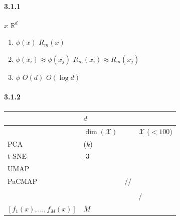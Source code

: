 \documentclass[
  12pt,
]{article}
\providecommand{\tightlist}{%
  \setlength{\itemsep}{0pt}\setlength{\parskip}{0pt}}
\begin{document}
\paragraph{3.1.1
}\label{ux5d4cux5165ux9009ux62e9ux7684ux539fux5219}

 \(x\) 
\(\mathbb{R}^d\)

\begin{enumerate}
\def\labelenumi{\arabic{enumi}.}
\tightlist
\item
  \textbf{}\(\phi(x)\)  \(R_m(x)\) 
\item
  \textbf{} \(\phi(x_i) \approx \phi(x_j)\) 
  \(R_m(x_i) \approx R_m(x_j)\)
\item
  \textbf{}\(\phi\)  \(O(d)\)  \(O(\log d)\) 
\end{enumerate}

\paragraph{3.1.2
}\label{ux5019ux9009ux5d4cux5165ux65b9ux6cd5}

\begin{longtable}[]{@{}
  >{\raggedright\arraybackslash}p{}
  >{\raggedright\arraybackslash}p{}
  >{\raggedright\arraybackslash}p{}
  >{\raggedright\arraybackslash}p{}@{}}
\toprule\noalign{}
\begin{minipage}[b]{\linewidth}\raggedright

\end{minipage} & \begin{minipage}[b]{\linewidth}\raggedright
 \(d\)
\end{minipage} & \begin{minipage}[b]{\linewidth}\raggedright

\end{minipage} & \begin{minipage}[b]{\linewidth}\raggedright

\end{minipage} \\
\midrule\noalign{}
\endhead
\bottomrule\noalign{}
\endlastfoot
 & \(\dim(\mathcal{X})\) &  & \(\mathcal{X}\) 
(\(<100\)) \\
PCA &  (\(k\)) &  &  \\
t-SNE & 2-3 &  &  \\
UMAP &  &  &  \\
PaCMAP &  & // &  \\
 &  &  &  \\
 &  &  & / \\
 \([f_1(x),\ldots,f_M(x)]\) & \(M\) &  &
 \\
\end{longtable}
\end{document}
